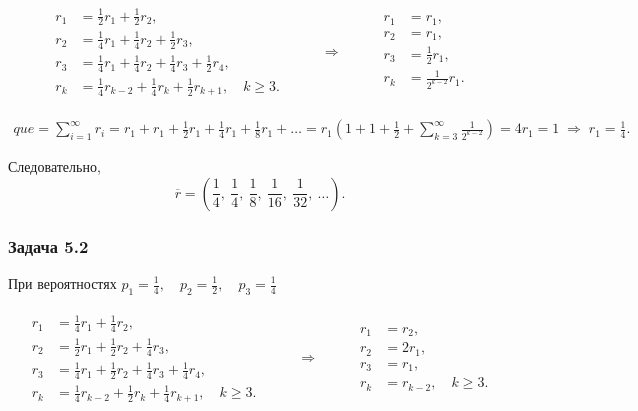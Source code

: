\[
	\begin{array}{rcl}
		\begin{aligned}
			r_1 & = \tfrac{1}{2} r_1 + \tfrac{1}{2} r_2,                                           \\
			r_2 & = \tfrac{1}{4} r_1 + \tfrac{1}{4} r_2 + \tfrac{1}{2} r_3,                        \\
			r_3 & = \tfrac{1}{4} r_1 + \tfrac{1}{4} r_2 + \tfrac{1}{4} r_3 + \tfrac{1}{2} r_4,     \\
			r_k & = \tfrac{1}{4} r_{k-2} + \tfrac{1}{4} r_k + \tfrac{1}{2} r_{k+1}, \quad k \ge 3.
		\end{aligned}
		 & \qquad \Rightarrow \qquad &
		\begin{aligned}
			r_1 & = r_1,                   \\
			r_2 & = r_1,                   \\
			r_3 & = \frac{1}{2} r_1,       \\
			r_k & = \frac{1}{2^{k-2}} r_1.
		\end{aligned}
	\end{array}
\]

\[
	\begin{aligned}
		que = \sum_{i=1}^\infty r_i
		= r_1 + r_1 + \tfrac{1}{2}r_1 + \tfrac{1}{4}r_1 + \tfrac{1}{8}r_1 + \ldots
		= r_1 \left(1 + 1 + \tfrac{1}{2} + \sum_{k=3}^\infty \tfrac{1}{2^{k-2}}\right)
		= 4r_1 = 1 \;\Rightarrow\; r_1 = \tfrac{1}{4}.
	\end{aligned}
\]


Следовательно,
\[
	\overline r = \left(\frac{1}{4},\ \frac{1}{4},\ \frac{1}{8},\ \frac{1}{16},\ \frac{1}{32},\ \ldots\right).
\]


\subsubsection*{Задача 5.2}

При вероятностях $p_1=\tfrac{1}{4},\quad p_2=\tfrac{1}{2},\quad p_3=\tfrac{1}{4}$

\[
	\begin{array}{rcl}
		\begin{aligned}
			r_1 & = \tfrac{1}{4} r_1 + \tfrac{1}{4} r_2,                                           \\
			r_2 & = \tfrac{1}{2} r_1 + \tfrac{1}{2} r_2 + \tfrac{1}{4} r_3,                        \\
			r_3 & = \tfrac{1}{4} r_1 + \tfrac{1}{2} r_2 + \tfrac{1}{4} r_3 + \tfrac{1}{4} r_4,     \\
			r_k & = \tfrac{1}{4} r_{k-2} + \tfrac{1}{2} r_k + \tfrac{1}{4} r_{k+1}, \quad k \ge 3.
		\end{aligned}
		 & \qquad \Rightarrow \qquad &
		\begin{aligned}
			r_1 & = r_2,                    \\
			r_2 & = 2r_1,                   \\
			r_3 & = r_1,                    \\
			r_k & = r_{k-2}, \quad k \ge 3.
		\end{aligned}
	\end{array}
\]

